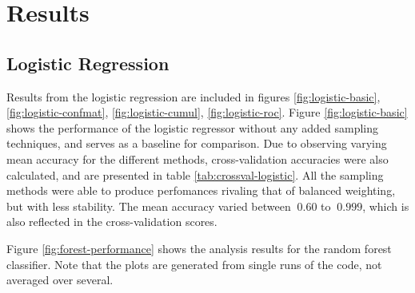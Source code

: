 \section{Results}
\subsection{Logistic Regression}
Results from the logistic regression are included in figures 
\ref{fig:logistic-basic}, \ref{fig:logistic-confmat}, \ref{fig:logistic-cumul}, 
\ref{fig:logistic-roc}. Figure \ref{fig:logistic-basic} shows the performance of
the logistic regressor without any added sampling techniques, and serves as
a baseline for comparison.
Due to observing varying mean accuracy for the different methods,
cross-validation accuracies were also calculated, and are presented in table
\ref{tab:crossval-logistic}.
All the sampling methods were able to produce perfomances rivaling that of
balanced weighting, but with less stability. The mean accuracy varied between
$~0.60$ to $~0.999$, which is also reflected in the cross-validation scores. 

Figure \ref{fig:forest-performance} shows the analysis results for the random
forest classifier. 
Note that the plots are generated from single runs of the code, not averaged
over several.

